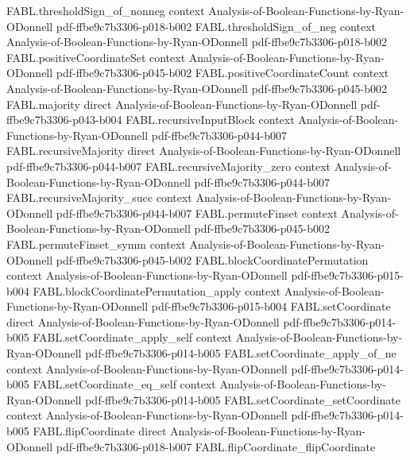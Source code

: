 \begin{theorem}
\proofstep
  {FABL.thresholdSign_of_nonneg}
  {context}
  {Analysis-of-Boolean-Functions-by-Ryan-ODonnell}
  {pdf-ffbe9c7b3306-p018-b002}
\proofstep
  {FABL.thresholdSign_of_neg}
  {context}
  {Analysis-of-Boolean-Functions-by-Ryan-ODonnell}
  {pdf-ffbe9c7b3306-p018-b002}
\proofstep
  {FABL.positiveCoordinateSet}
  {context}
  {Analysis-of-Boolean-Functions-by-Ryan-ODonnell}
  {pdf-ffbe9c7b3306-p045-b002}
\proofstep
  {FABL.positiveCoordinateCount}
  {context}
  {Analysis-of-Boolean-Functions-by-Ryan-ODonnell}
  {pdf-ffbe9c7b3306-p045-b002}
\proofstep
  {FABL.majority}
  {direct}
  {Analysis-of-Boolean-Functions-by-Ryan-ODonnell}
  {pdf-ffbe9c7b3306-p043-b004}
\proofstep
  {FABL.recursiveInputBlock}
  {context}
  {Analysis-of-Boolean-Functions-by-Ryan-ODonnell}
  {pdf-ffbe9c7b3306-p044-b007}
\proofstep
  {FABL.recursiveMajority}
  {direct}
  {Analysis-of-Boolean-Functions-by-Ryan-ODonnell}
  {pdf-ffbe9c7b3306-p044-b007}
\proofstep
  {FABL.recursiveMajority_zero}
  {context}
  {Analysis-of-Boolean-Functions-by-Ryan-ODonnell}
  {pdf-ffbe9c7b3306-p044-b007}
\proofstep
  {FABL.recursiveMajority_succ}
  {context}
  {Analysis-of-Boolean-Functions-by-Ryan-ODonnell}
  {pdf-ffbe9c7b3306-p044-b007}
\proofstep
  {FABL.permuteFinset}
  {context}
  {Analysis-of-Boolean-Functions-by-Ryan-ODonnell}
  {pdf-ffbe9c7b3306-p045-b002}
\proofstep
  {FABL.permuteFinset_symm}
  {context}
  {Analysis-of-Boolean-Functions-by-Ryan-ODonnell}
  {pdf-ffbe9c7b3306-p045-b002}
\proofstep
  {FABL.blockCoordinatePermutation}
  {context}
  {Analysis-of-Boolean-Functions-by-Ryan-ODonnell}
  {pdf-ffbe9c7b3306-p015-b004}
\proofstep
  {FABL.blockCoordinatePermutation_apply}
  {context}
  {Analysis-of-Boolean-Functions-by-Ryan-ODonnell}
  {pdf-ffbe9c7b3306-p015-b004}
\proofstep
  {FABL.setCoordinate}
  {direct}
  {Analysis-of-Boolean-Functions-by-Ryan-ODonnell}
  {pdf-ffbe9c7b3306-p014-b005}
\proofstep
  {FABL.setCoordinate_apply_self}
  {context}
  {Analysis-of-Boolean-Functions-by-Ryan-ODonnell}
  {pdf-ffbe9c7b3306-p014-b005}
\proofstep
  {FABL.setCoordinate_apply_of_ne}
  {context}
  {Analysis-of-Boolean-Functions-by-Ryan-ODonnell}
  {pdf-ffbe9c7b3306-p014-b005}
\proofstep
  {FABL.setCoordinate_eq_self}
  {context}
  {Analysis-of-Boolean-Functions-by-Ryan-ODonnell}
  {pdf-ffbe9c7b3306-p014-b005}
\proofstep
  {FABL.setCoordinate_setCoordinate}
  {context}
  {Analysis-of-Boolean-Functions-by-Ryan-ODonnell}
  {pdf-ffbe9c7b3306-p014-b005}
\proofstep
  {FABL.flipCoordinate}
  {direct}
  {Analysis-of-Boolean-Functions-by-Ryan-ODonnell}
  {pdf-ffbe9c7b3306-p018-b007}
\proofstep
  {FABL.flipCoordinate_flipCoordinate}

\end{theorem}
